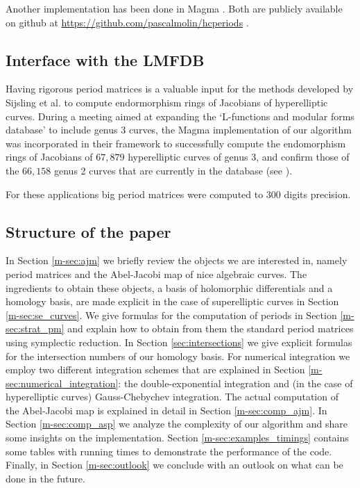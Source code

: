 \documentclass[main.tex]{subfiles}
\begin{document}
  Another implementation has been done in Magma \cite{Magma}. Both are publicly available
  on github at \url{https://github.com/pascalmolin/hcperiods} \cite{githubhcperiods_2017_833727}.

  \subsection{Interface with the LMFDB}

  Having rigorous period matrices is a valuable input for the methods developed by
  Sijsling et al. \cite{CMSVEndos} to compute endormorphism rings of Jacobians of hyperelliptic
  curves.
  During a meeting aimed at expanding the `L-functions and modular forms database' \cite[LMFDB]{lmfdb}
  to include genus $3$ curves, the Magma implementation of our algorithm was incorporated in their framework
  to successfully compute the endomorphism rings of Jacobians of $67,879$ hyperelliptic
  curves of genus $3$, and confirm those of the $66,158$ genus
  2 curves that are currently in the database (see \cite[LMFDB]{Genus2LMFDB}).

  For these applications big period matrices were computed to $300$ digits precision.

  \subsection{Structure of the paper}

  In Section \ref{m-sec:ajm} we briefly review the objects we are interested
  in, namely period matrices and the Abel-Jacobi map of nice algebraic curves.
  The ingredients to obtain these objects, a basis of holomorphic differentials
  and a homology basis, are made explicit in the case of superelliptic curves
  in Section \ref{m-sec:se_curves}.
  We give formulas for the computation of periods in Section
  \ref{m-sec:strat_pm} and explain how to obtain from them the standard period
  matrices using symplectic reduction.
  In Section \ref{sec:intersections} we give explicit formulas for the
  intersection numbers of our homology basis.
  For numerical integration we employ two different integration schemes that
  are explained in Section \ref{m-sec:numerical_integration}: the
  double-exponential integration and
  (in the case of hyperelliptic curves) Gauss-Chebychev integration.
  The actual computation of the Abel-Jacobi map is explained in detail in
  Section \ref{m-sec:comp_ajm}.
  In Section \ref{m-sec:comp_asp} we analyze the complexity of our algorithm
  and share some insights on the implementation.
  Section \ref{m-sec:examples_timings} contains some tables with
  running times to demonstrate the performance of the code.
  Finally, in Section \ref{m-sec:outlook} we conclude with an outlook on what can be done in the future.
  
\end{document}
